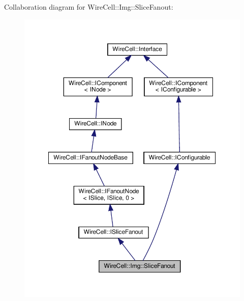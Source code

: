 Collaboration diagram for Wire\+Cell\+:\+:Img\+:\+:Slice\+Fanout\+:
\nopagebreak
\begin{figure}[H]
\begin{center}
\leavevmode
\includegraphics[width=350pt]{class_wire_cell_1_1_img_1_1_slice_fanout__coll__graph}
\end{center}
\end{figure}
